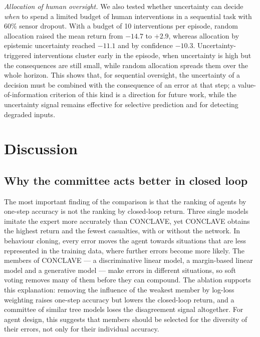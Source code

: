 \documentclass[journal]{IEEEtran}
\begin{document}
\textit{Allocation of human oversight.} We also tested whether uncertainty
can decide \emph{when} to spend a limited budget of human interventions in a
sequential task with $60\%$ sensor dropout. With a budget of 10 interventions per
episode, random allocation raised the mean return from $-14.7$ to $+2.9$,
whereas allocation by epistemic uncertainty reached $-11.1$ and by confidence
$-10.3$. Uncertainty-triggered interventions cluster early in the episode,
when uncertainty is high but the consequences are still small, while random
allocation spreads them over the whole horizon. This shows that, for
sequential oversight, the uncertainty of a decision must be combined with the
consequence of an error at that step; a value-of-information criterion of this
kind is a direction for future work, while the uncertainty signal remains
effective for selective prediction and for detecting degraded inputs.

\section{Discussion}\label{sec:discussion}

\subsection{Why the committee acts better in closed loop}
The most important finding of the comparison is that the ranking of agents by
one-step accuracy is not the ranking by closed-loop return. Three single
models imitate the expert more accurately than CONCLAVE, yet CONCLAVE obtains
the highest return and the fewest casualties, with or without the network. In
behaviour cloning, every error moves the agent towards situations that are
less represented in the training data, where further errors become more
likely. The members of CONCLAVE --- a discriminative linear model, a
margin-based linear model and a generative model --- make errors in different
situations, so soft voting removes many of them before they can compound. The
ablation supports this explanation: removing the influence of the weakest
member by log-loss weighting raises one-step accuracy but lowers the
closed-loop return, and a committee of similar tree models loses the
disagreement signal altogether. For agent design, this suggests that members
should be selected for the diversity of their errors, not only for their
individual accuracy.
\end{document}
